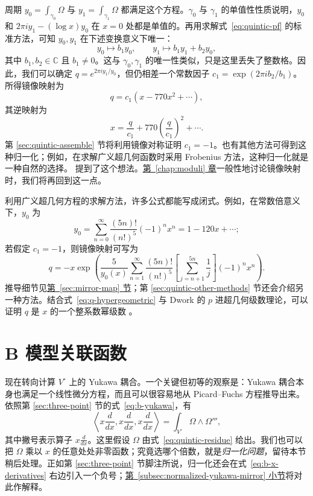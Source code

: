 周期 $y_0=\int_{\gamma_0}\Omega$ 与 $y_1=\int_{\gamma_1}\Omega$ 都满足这个方程。$\gamma_0$ 与 $\gamma_1$ 的单值性性质说明，$y_0$ 和 $2\pi i y_1-(\log x)y_0$ 在 $x=0$ 处都是单值的。再用求解式~\eqref{eq:quintic-pf} 的标准方法，可知 $y_0,y_1$ 在下述变换意义下唯一：
\[
y_0\longmapsto b_1y_0,\qquad y_1\longmapsto b_1y_1+b_2y_0,
\]
其中 $b_1,b_2\in\mathbb C$ 且 $b_1\ne0$。这与 $\gamma_0,\gamma_1$ 的唯一性类似，只是这里丢失了整数格。因此，我们可以确定 $q=e^{2\pi i y_1/y_0}$，但仍相差一个常数因子 $c_1=\exp(2\pi i b_2/b_1)$。所得镜像映射为
\begin{equation}\label{eq:q-series-c1}
q=c_1(x-770x^2+\cdots),
\end{equation}
其逆映射为
\begin{equation}\label{eq:x-series-c1}
x=\frac q{c_1}+770\left(\frac q{c_1}\right)^2+\cdots.
\end{equation}
第 \ref{sec:quintic-assemble} 节将利用镜像对称证明 $c_1=-1$。也有其他方法可得到这种归一化；例如，在求解广义超几何函数时采用 Frobenius 方法，这种归一化就是一种自然的选择。 提到了这个想法。\hyperref[chap:moduli]{第~\ref*{chap:moduli} 章}一般性地讨论镜像映射时，我们将再回到这一点。

利用广义超几何方程的求解方法，许多公式都能写成闭式。例如，在常数倍意义下，$y_0$ 为
\begin{equation}\label{eq:y0-hypergeometric}
y_0=\sum_{n=0}^{\infty}\frac{(5n)!}{(n!)^5}(-1)^n x^n=1-120x+\cdots;
\end{equation}
若假定 $c_1=-1$，则镜像映射可写为
\begin{equation}\label{eq:q-hypergeometric}
q=-x\exp\!\left(\frac{5}{y_0(x)}\sum_{n=1}^{\infty}\frac{(5n)!}{(n!)^5}
\left[\sum_{j=n+1}^{5n}\frac1j\right](-1)^n x^n\right).
\end{equation}
推导细节见\hyperref[sec:mirror-map]{第~\ref*{sec:mirror-map} 节}；第 \ref{sec:quintic-other-methods} 节还会介绍另一种方法。结合式~\eqref{eq:q-hypergeometric} 与 Dwork 的 $p$ 进超几何级数理论，可以证明 $q$ 是 $x$ 的一个整系数幂级数 。

\section{B 模型关联函数}\label{sec:quintic-b-model}

现在转向计算 $V^\circ$ 上的 Yukawa 耦合。一个关键但初等的观察是：Yukawa 耦合本身也满足一个线性微分方程，而且可以很容易地从 Picard--Fuchs 方程推导出来。依照第 \ref{sec:three-point} 节的式~\eqref{eq:b-yukawa}，有
\begin{equation}\label{eq:b-x-derivatives}
\left\langle x\frac d{dx},x\frac d{dx},x\frac d{dx}\right\rangle
=\int_{V^\circ}\Omega\wedge\Omega''',
\end{equation}
其中撇号表示算子 $x\frac d{dx}$。这里假设 $\Omega$ 由式~\eqref{eq:quintic-residue} 给出。我们也可以把 $\Omega$ 乘以 $x$ 的任意处处非零函数；究竟选哪个倍数，就是\emph{归一化问题}，留待本节稍后处理。正如第 \ref{sec:three-point} 节脚注所说，归一化还会在式~\eqref{eq:b-x-derivatives} 右边引入一个负号；\hyperref[subsec:normalized-yukawa-mirror]{第~\ref*{subsec:normalized-yukawa-mirror} 小节}将对此作解释。


